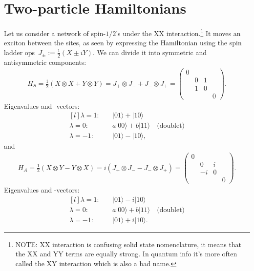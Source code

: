 \documentclass[aps,pra,12pt,nofootinbib,superscriptaddress,longbibliography,showpacs]{revtex4-1}
\theoremstyle{plain}
\theoremstyle{definition}
\newcommand{\ket}[1]{\ensuremath{|#1\rangle}}
\newcommand{\be}{\begin{equation}}
\newcommand{\ee}{\end{equation}}
\begin{document}
\section{Two-particle Hamiltonians} 

Let us consider a network of spin-$1/2$'s under the XX interaction.\footnote{NOTE: XX interaction is confusing solid state nomenclature, it means that the XX
and YY terms are equally strong. In quantum info it's more often
called the XY interaction which is also a bad name.}
It moves an exciton between the sites, as seen by expressing the
Hamiltonian using the spin ladder ops~$J_\pm := \tfrac{1}{2}(X \pm i Y)$.
We can divide it into symmetric and antisymmetric components:
\begin{align}
H_S = \frac{1}{2}\left(X \otimes X +Y \otimes Y\right)
= J_+ \otimes J_- +J_- \otimes J_+
=
\begin{pmatrix}
0\\
& 0 & 1\\
& 1 & 0\\
& & & 0
\end{pmatrix}.
\label{eq:HS}
\end{align}
Eigenvalues and -vectors:
\be
\begin{matrix*}[l]
\lambda = 1: & \quad \ket{01} +\ket{10}\\
\lambda = 0: & \quad a\ket{00} +b\ket{11} \quad \text{(doublet)}\\
\lambda = -1: & \quad \ket{01} -\ket{10},
\end{matrix*}
\ee
and
\begin{align}
H_A = \frac{1}{2}\left(X \otimes Y -Y \otimes X\right)
= i\left(J_+ \otimes J_- -J_- \otimes J_+ \right)
=
\begin{pmatrix}
0\\
& 0 & i\\
& -i & 0\\
& & & 0
\end{pmatrix}.
\label{eq:HA}
\end{align}
Eigenvalues and -vectors:
\be
\begin{matrix*}[l]
\lambda = 1: & \quad \ket{01} -i\ket{10}\\
\lambda = 0: & \quad a\ket{00} +b\ket{11} \quad \text{(doublet)}\\
\lambda = -1: & \quad \ket{01} +i\ket{10}.
\end{matrix*}
\ee
\end{document}
